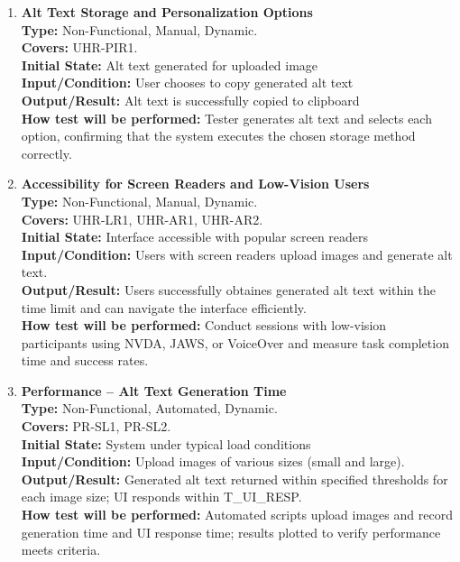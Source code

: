 \documentclass[12pt, titlepage]{article}
\begin{document}
\begin{enumerate}[label=NFR-ST \arabic*., wide=0pt, leftmargin=*]
  \item \textbf{Alt Text Storage and Personalization Options} \\[2mm]
    \textbf{Type:} Non-Functional, Manual, Dynamic. \\
    \textbf{Covers:} UHR-PIR1. \\
    \textbf{Initial State:} Alt text generated for uploaded image \\
    \textbf{Input/Condition:} User chooses to copy
    generated alt text \\
    \textbf{Output/Result:} Alt text is successfully copied to
    clipboard\\[2mm]
    \textbf{How test will be performed:} Tester generates alt text
    and selects each option, confirming that the system executes the
    chosen storage method correctly.

  \item \textbf{Accessibility for Screen Readers and Low-Vision Users} \\[2mm]
    \textbf{Type:} Non-Functional, Manual, Dynamic. \\
    \textbf{Covers:} UHR-LR1, UHR-AR1, UHR-AR2.\\
    \textbf{Initial State:} Interface accessible with popular screen readers \\
    \textbf{Input/Condition:} Users with screen readers upload images
    and generate alt text. \\
    \textbf{Output/Result:} Users successfully obtaines generated alt text
    within the time limit and can navigate the interface efficiently. \\[2mm]
    \textbf{How test will be performed:} Conduct sessions with
    low-vision participants using NVDA, JAWS, or VoiceOver and
    measure task completion time and success rates.

  \item \textbf{Performance – Alt Text Generation Time} \\[2mm]
    \textbf{Type:} Non-Functional, Automated, Dynamic. \\
    \textbf{Covers:} PR-SL1, PR-SL2. \\
    \textbf{Initial State:} System under typical load conditions \\
    \textbf{Input/Condition:} Upload images of various sizes (small
    and large). \\
    \textbf{Output/Result:} Generated alt text returned within
    specified thresholds for each image size; UI responds within
    T\_UI\_RESP. \\[2mm]
    \textbf{How test will be performed:} Automated scripts upload
    images and record generation time and UI response time; results
    plotted to verify performance meets criteria.


\end{enumerate}
\end{document}
